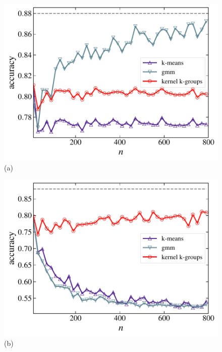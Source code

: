 \documentclass[10pt,journal,compsoc]{IEEEtran}
\begin{document}
\begin{figure}
\centering
\begin{minipage}{.4\textwidth}
\includegraphics[width=1\textwidth]{gauss_1d.pdf}\\[-2em](a)
\end{minipage}
\begin{minipage}{.4\textwidth}
\includegraphics[width=1\textwidth]{loggauss_1d.pdf} \\[-2em](b)
\end{minipage}\\[1em]
\begin{minipage}{.37\textwidth}

\end{minipage}
\end{figure}
\end{document}
